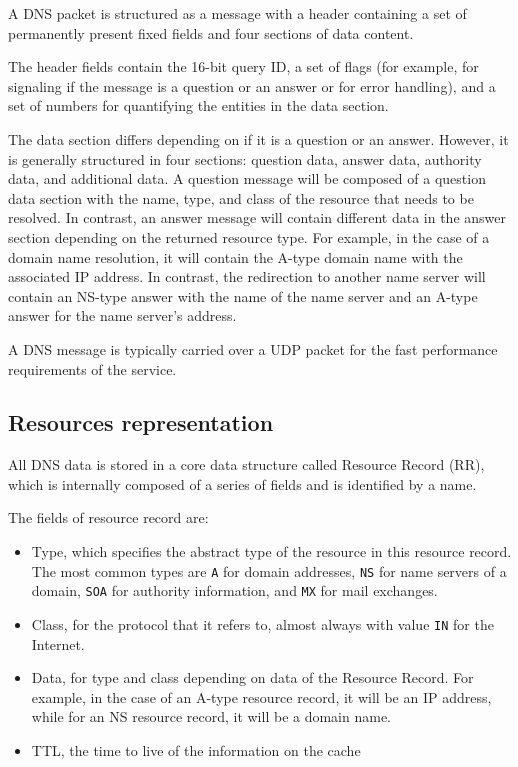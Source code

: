 \documentclass[11pt,a4paper]{article}
\begin{document}
A DNS packet is structured as a message with a header containing a set of permanently present fixed
fields and four sections of data content.

\noindent
The header fields contain the 16-bit query ID, a set of flags (for example, for signaling if the message is a question or an answer or for error handling), and a set of numbers for quantifying
the entities in the data section.

\noindent
The data section differs depending on if it is a question or an answer. However, it is generally structured
in four sections: question data, answer data, authority data, and additional data. A question
message will be composed of a question data section with the name, type, and class of the
resource that needs to be resolved. In contrast, an answer message will contain different data in the
answer section depending on the returned resource type. For example, in the case of a
domain name resolution, it will contain the A-type domain name with the associated IP address. In contrast, the redirection to another name server will contain an NS-type answer with the name of the
name server and an A-type answer for the name server's address.

\hfill \break
\noindent
A DNS message is typically carried over a UDP packet for the fast performance requirements
of the service.

\subsection{Resources representation}
All DNS data is stored in a core data structure called Resource Record (RR), which is internally
composed of a series of fields and is identified by a name.

\hfill \break
\noindent
The fields of resource record are:
\begin{itemize}
\item Type, which specifies the abstract type of the resource in this resource record. The most common types are \texttt{A} for domain addresses, \texttt{NS} for name servers of a domain, \texttt{SOA} for authority information, and \texttt{MX} for mail exchanges.
\item Class, for the protocol that it refers to, almost always with value \texttt{IN} for the Internet.
\item Data, for type and class depending on data of the Resource Record. For example, in the case of an A-type resource record, it will be an IP address, while for an NS resource record, it will be a domain name.
\item TTL, the time to live of the information on the cache
\end{itemize}
\end{document}
